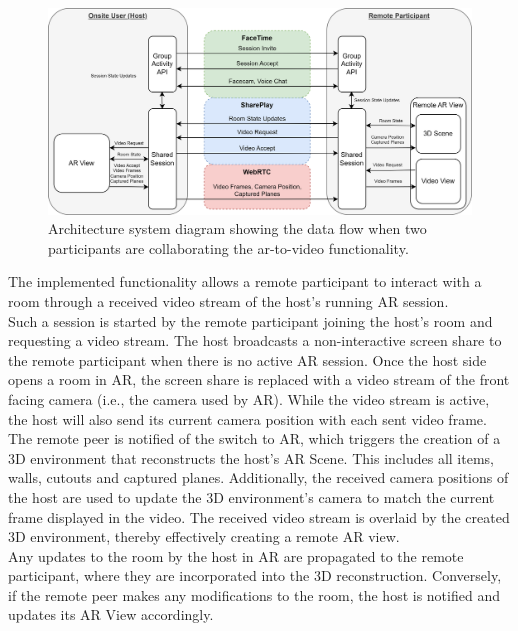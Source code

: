 \documentclass{article}
\begin{document}
\begin{figure}[H]
  \centering
  \includegraphics[width=1\textwidth]{img/architecture_system_diagram_overview.png}
  \caption{Architecture system diagram showing the data flow when two participants are collaborating the ar-to-video functionality.}
  \label{screenshot:screenshare}
\end{figure}
The implemented functionality allows a remote participant to interact with a room through a received video stream of the host's running AR session. \\
Such a session is started by the remote participant joining the host's room and requesting a video stream. The host broadcasts a non-interactive screen share to the remote participant when there is no active AR session. Once the host side opens a room in AR, the screen share is replaced with a video stream of the front facing camera (i.e., the camera used by AR). While the video stream is active, the host will also send its current camera position with each sent video frame. \\
The remote peer is notified of the switch to AR, which triggers the creation of a 3D environment that reconstructs the host's AR Scene. This includes all items, walls, cutouts and captured planes. Additionally, the received camera positions of the host are used to update the 3D environment's camera to match the current frame displayed in the video. The received video stream is overlaid by the created 3D environment, thereby effectively creating a remote AR view.\\
Any updates to the room by the host in AR are propagated to the remote participant, where they are incorporated into the 3D reconstruction. Conversely, if the remote peer makes any modifications to the room, the host is notified and updates its AR View accordingly.
\end{document}
